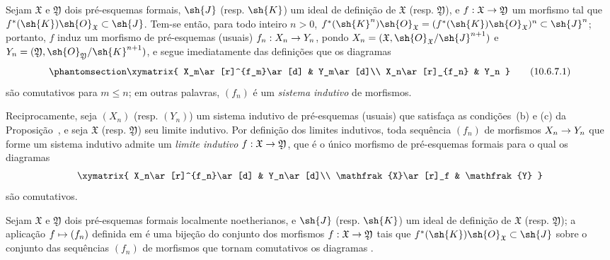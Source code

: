 \documentclass[oneside]{amsart}
\makeatletter
\renewcommand{\leq}{\leqslant}
\newcommand{\ega@arrow}[2]{\mathchoice{#1}{#2}{#2}{#2}}
\let\ega@shortmapsto\mapsto
\renewcommand{\to}{\ega@arrow{\longrightarrow}{\rightarrow}}
\renewcommand{\mapsto}{\ega@arrow{\longmapsto}{\ega@shortmapsto}}
\newcommand{\oldpage}[2][]{{\marginnote{\normalfont\textbf{#1}~|~#2}}\ignorespaces}
\let\EGAOriginalLabel\label
\renewcommand{\label}[1]{\phantomsection\EGAOriginalLabel{#1}}
\makeatother
\begin{document}
\begin{env}[10.6.7]
\label{I.10.6.7}
Sejam $\mathfrak{X}$ e $\mathfrak{Y}$ dois pré-esquemas formais, $\sh{J}$ (resp. $\sh{K}$) um ideal de definição de $\mathfrak{X}$ (resp. $\mathfrak{Y}$), e $f:\mathfrak{X}\to\mathfrak{Y}$ um morfismo tal que $f^*(\sh{K})\sh{O}_\mathfrak{X}\subset\sh{J}$.
Tem-se então, para todo inteiro $n>0$, $f^*(\sh{K}^n)\sh{O}_\mathfrak{X}=(f^*(\sh{K})\sh{O}_\mathfrak{X})^n\subset\sh{J}^n$; portanto, $f$ induz  um morfismo de pré-esquemas (usuais) $f_n:X_n\to Y_n$, pondo $X_n=(\mathfrak{X},\sh{O}_\mathfrak{X}/\sh{J}^{n+1})$ e $Y_n=(\mathfrak{Y},\sh{O}_\mathfrak{Y}/\sh{K}^{n+1})$, e segue imediatamente das definições que os diagramas
\[
\label{I.10.6.7.1}
  \xymatrix{
    X_m\ar[r]^{f_m}\ar[d] &
    Y_m\ar[d]\\
    X_n\ar[r]_{f_n} &
    Y_n
  }
  \tag{10.6.7.1}
\]
\oldpage[I]{192}
são comutativos para $m\leq n$; em outras palavras, $(f_n)$ é um \emph{sistema indutivo} de morfismos.
\end{env}

\begin{env}[10.6.8]
\label{I.10.6.8}
Reciprocamente, seja $(X_n)$ (resp. $(Y_n)$) um sistema indutivo de pré-esquemas (usuais) que satisfaça as condições~(b) e (c) da Proposição~, e seja $\mathfrak{X}$ (resp. $\mathfrak{Y}$) seu limite indutivo.
Por definição dos limites indutivos, toda sequência $(f_n)$ de morfismos $X_n\to Y_n$ que forme um sistema indutivo admite um \emph{limite indutivo $f:\mathfrak{X}\to\mathfrak{Y}$}, que é o único morfismo de pré-esquemas formais para o qual os diagramas
\[
  \xymatrix{
    X_n\ar[r]^{f_n}\ar[d] &
    Y_n\ar[d]\\
    \mathfrak{X}\ar[r]_f &
    \mathfrak{Y}
  }
\]
são comutativos.
\end{env}

\begin{proposition}[10.6.9]
\label{I.10.6.9}
Sejam $\mathfrak{X}$ e $\mathfrak{Y}$ dois pré-esquemas formais localmente noetherianos, e $\sh{J}$ (resp. $\sh{K}$) um ideal de definição de $\mathfrak{X}$ (resp. $\mathfrak{Y}$); a aplicação $f\mapsto(f_n)$ definida em  é uma bijeção do conjunto dos morfismos $f:\mathfrak{X}\to\mathfrak{Y}$ tais que $f^*(\sh{K})\sh{O}_\mathfrak{X}\subset\sh{J}$ sobre o conjunto das sequências $(f_n)$ de morfismos que tornam comutativos os diagramas .
\end{proposition}
\end{document}
